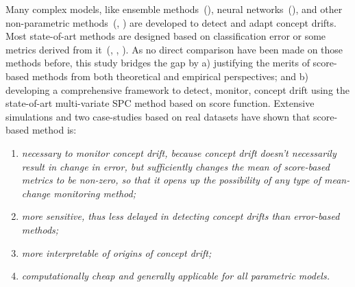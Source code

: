 \documentclass[twoside,11pt]{article}
\begin{document}
 Many complex models, like ensemble methods~(\cite{wang2003mining}), neural networks~(\cite{calandra2012learning}), and other non-parametric methods~(\cite{dos2016fast}, \cite{frias2015online}) are developed to detect and adapt concept drifts. Most state-of-art methods are designed based on classification error or some metrics derived from it~(\cite{barros2018large}, \cite{ross2012exponentially}, \cite{gonccalves2014comparative}).   As no direct  comparison have been made on those methods before, this study bridges the gap  by a) justifying the merits of score-based methods from both theoretical and empirical perspectives; and b) developing a comprehensive framework to detect, monitor,  concept drift using the state-of-art multi-variate SPC method based on score function. Extensive simulations and two case-studies based on real datasets have shown that score-based method is: 
\begin{enumerate}[1)]
\item
\textit{necessary to monitor concept drift, because concept drift doesn't necessarily result in change in error, but sufficiently changes the mean of score-based metrics to be non-zero, so that it opens up the possibility of any type of mean-change monitoring method;}
\item
\textit{more sensitive, thus less delayed in detecting concept drifts than error-based methods;}
\item
\textit{more interpretable of origins of concept drift;}
\item
\textit{computationally cheap and generally applicable for all parametric models.}
\end{enumerate}
\end{document}
